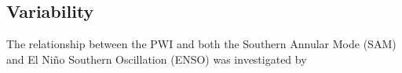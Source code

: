 \subsection{Variability}

The relationship between the PWI and both the Southern Annular Mode (SAM) and El Ni\~{n}o Southern Oscillation (ENSO) was investigated by